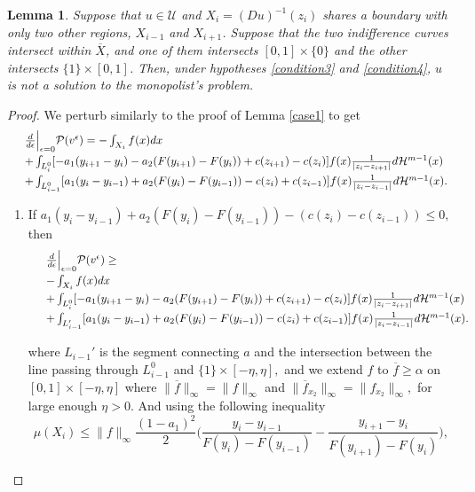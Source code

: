 \documentclass[12pt,reqno]{amsart}
\newtheorem{lem}{Lemma}
\begin{document}
\begin{lem}\label{case3}
     Suppose that $u \in \mathcal{U}$ and $X_i =(Du)^{-1}(z_i)$ shares a boundary with only two other regions, $X_{i-1}$ and $X_{i+1}$.  Suppose that the two indifference curves intersect within $\overline{X}$, and one of them intersects $[0,1]\times\{0\}$ and the other intersects $\{1\} \times [0,1]$.  Then, under hypotheses \ref{condition3} and \ref{condition4}, $u$ is not a solution to the monopolist's problem.   
\end{lem}
\begin{proof}
 We perturb similarly to the proof of Lemma \ref{case1} to get 
    \[\begin{array}{ll}
         &\frac{d}{d\epsilon}\Big|_{\epsilon=0} \mathcal P(v^\epsilon)  =-\int_{X_i}f(x)dx \vspace{3pt}\\
      &+\int_{L^0_{i}}[-a_1(y_{i+1}-y_i)-a_2(F(y_{i+1})-F(y_i)) +c(z_{i+1})-c(z_{i}) ]f(x)\frac{1}{|z_i-z_{i+1}|}d\mathcal H^{m-1}(x) \vspace{3pt}\\
&+    \int_{L^0_{i-1}}[a_1(y_i-y_{i-1})+a_2(F(y_{i})-F(y_{i-1}))-c(z_i) + c(z_{i-1}) ]f(x)\frac{1}{|z_i-z_{i-1}|}d\mathcal H^{m-1}(x). 
\end{array}\]
\begin{enumerate}
    \item If $ a_1(y_{i}-y_{i-1})+a_2(F(y_{i})-F(y_{i-1})) -(c(z_{i})-c(z_{i-1}))\le0,$ then
    \[ \begin{array}{ll}
        & \frac{d}{d\epsilon}\Big|_{\epsilon=0} \mathcal P(v^\epsilon)  \ge\vspace{3pt}\\
         &-\int_{X_i}f(x)dx \vspace{3pt}\\
      &+\int_{L^0_{i}}[-a_1(y_{i+1}-y_i)-a_2(F(y_{i+1})-F(y_i)) +c(z_{i+1})-c(z_{i}) ]f(x)\frac{1}{|z_i-z_{i+1}|}d\mathcal H^{m-1}(x) \vspace{3pt}\\
&+     \int_{L'_{i-1}}[a_1(y_i-y_{i-1})+a_2(F(y_{i})-F(y_{i-1}))-c(z_i) + c(z_{i-1}) ]f(x)\frac{1}{|z_i-z_{i-1}|}d\mathcal H^{m-1}(x). 
\end{array}\]

where $L_{i-1}'$ is the segment connecting $a$ and the intersection between the line passing through $L_{i-1}^0$ and  $\{1\}\times[-\eta,\eta],$ and we extend $f$  to $\overline{f}\ge\alpha$ on $[0,1]\times[-\eta,\eta]$ where $\|\overline{f}\|_\infty=\|f\|_\infty$ and $\|\overline{f}_{x_2}\|_\infty=\|f_{x_2}\|_\infty,$ for large enough $\eta>0.$ And using the following inequality
     \[\mu( X_i)\le \|f\|_\infty\frac{(1-a_1)^2}{2}\Big(\frac{y_i-y_{i-1}}{F(y_i)-F(y_{i-1})}-\frac{y_{i+1}-y_i}{F(y_{i+1})-F(y_i)}\Big),\]


\end{enumerate}
\end{proof}
\end{document}
